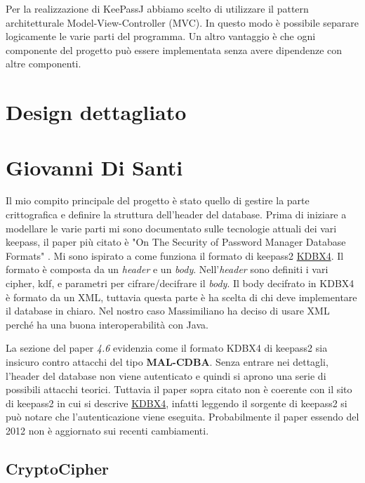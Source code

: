 \documentclass[a4paper,12pt]{report}
\begin{document}
Per la realizzazione di KeePassJ abbiamo scelto di utilizzare il pattern architetturale
Model-View-Controller (MVC). In questo modo è possibile separare logicamente le
varie parti del programma. Un altro vantaggio è che ogni componente del progetto
può essere implementata senza avere dipendenze con altre componenti.

\section{Design dettagliato}

\section*{Giovanni Di Santi}

Il mio compito principale del progetto è stato quello di gestire la parte crittografica e
definire la struttura dell'header del database. 
Prima di iniziare a modellare le varie parti mi sono documentato sulle tecnologie attuali dei vari keepass,
il paper più citato è "On The Security of Password Manager Database Formats" \cite{security}.
Mi sono ispirato a come funziona il formato di keepass2 \href{https://keepass.info/help/kb/kdbx_4.html}{KDBX4}.
Il formato è composta da un \textit{header} e un \textit{body}.
Nell'\textit{header} sono definiti i vari cipher, kdf, e parametri per cifrare/decifrare
il \textit{body}. Il body decifrato in KDBX4 è formato da un XML, tuttavia questa parte è ha scelta
di chi deve implementare il database in chiaro. Nel nostro caso Massimiliano ha
deciso di usare XML perché ha una buona interoperabilità con Java.

La sezione del paper \textit{4.6} evidenzia come il formato KDBX4 di keepass2 sia
insicuro contro attacchi del tipo \textbf{MAL-CDBA}. Senza entrare nei dettagli,
l'header del database non viene autenticato e quindi si aprono una serie di possibili
attacchi teorici.
Tuttavia il paper sopra citato non è coerente con il sito di keepass2 in cui si descrive
\href{https://keepass.info/help/kb/kdbx_4.html}{KDBX4}, infatti leggendo il sorgente di
keepass2 si può notare che l'autenticazione viene eseguita. Probabilmente il paper
essendo del 2012 non è aggiornato sui recenti cambiamenti.

\subsection*{CryptoCipher}
\end{document}
